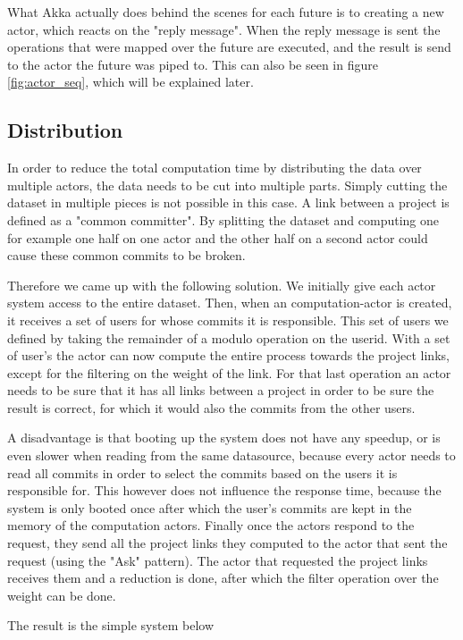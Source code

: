 \documentclass[10pt,a4paper]{article}
\begin{document}
What Akka actually does behind the scenes for each future is to creating a new actor, which reacts on the "reply message". When the reply message is sent the operations that were mapped over the future are executed, and the result is send to the actor the future was piped to. This can also be seen in figure \ref{fig:actor_seq}, which will be explained later.

\subsection{Distribution}

In order to reduce the total computation time by distributing the data over multiple actors, the data needs to be cut into multiple parts. Simply cutting the dataset in multiple pieces is not possible in this case. A link between a project is defined as a "common committer". By splitting the dataset and computing one for example one half on one actor and the other half on a second actor could cause these common commits to be broken. 

Therefore we came up with the following solution. We initially give each actor system access to the entire dataset. Then, when an computation-actor is created, it receives a set of users for whose commits it is responsible. This set of users we defined by taking the remainder of a modulo operation on the userid. With a set of user's the actor can now compute the entire process towards the project links, except for the filtering on the weight of the link. For that last operation an actor needs to be sure that it has all links between a project in order to be sure the result is correct, for which it would also the commits from the other users.

A disadvantage is that booting up the system does not have any speedup, or is even slower when reading from the same datasource, because every actor needs to read all commits in order to select the commits based on the users it is responsible for. This however does not influence the response time, because the system is only booted once after which the user's commits are kept in the memory of the computation actors. Finally once the actors respond to the request, they send all the project links they computed to the actor that sent the request (using the "Ask" pattern). The actor that requested the project links receives them and a reduction is done, after which the filter operation over the weight can be done.

The result is the simple system below
\end{document}

